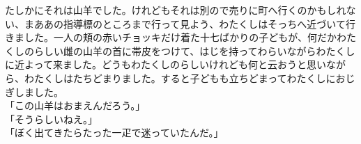 たしかにそれは山羊でした。けれどもそれは別ので売りに町へ行くのかもしれない、まああの指導標のところまで行って見よう、わたくしはそっちへ近づいて行きました。一人の頬の赤いチョッキだけ着た十七ばかりの子どもが、何だかわたくしのらしい雌の山羊の首に帯皮をつけて、はじを持ってわらいながらわたくしに近よって来ました。どうもわたくしのらしいけれども何と云おうと思いながら、わたくしはたちどまりました。すると子どもも立ちどまってわたくしにおじぎしました。\\
「この山羊はおまえんだろう。」\\
「そうらしいねえ。」\\
「ぼく出てきたらたった一疋で迷っていたんだ。」